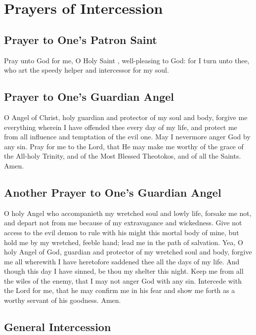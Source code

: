 \section{Prayers of Intercession}

\subsection{Prayer to One's Patron Saint}

Pray unto God for me, O Holy Saint , well-pleasing to God: for I turn unto thee, who art the speedy helper and intercessor for my soul.

\subsection{Prayer to One's Guardian Angel}

O Angel of Christ, holy guardian and protector of my soul and body,
forgive me everything wherein I have offended thee every day of my life,
and protect me from all influence and temptation of the evil one. May I
nevermore anger God by any sin. Pray for me to the Lord, that He may
make me worthy of the grace of the All-holy Trinity, and of the Most
Blessed Theotokos, and of all the Saints. Amen.

\subsection{Another Prayer to One's Guardian Angel}

O holy Angel who accompanieth my wretched soul and lowly life, forsake me not, and depart not from me because of my extravagance and wickedness. Give not access to the evil demon to rule with his might this mortal body of mine, but hold me by my wretched, feeble hand; lead me in the path of salvation. Yea, O holy Angel of God, guardian and protector of my wretched soul and body, forgive me all wherewith I have heretofore saddened thee all the days of my life. And though this day I have sinned, be thou my shelter this night. Keep me from all the wiles of the enemy, that I may not anger God with any sin. Intercede with the Lord for me, that he may confirm me in his fear and show me forth as a worthy servant of his goodness. Amen.

\subsection{General Intercession}

